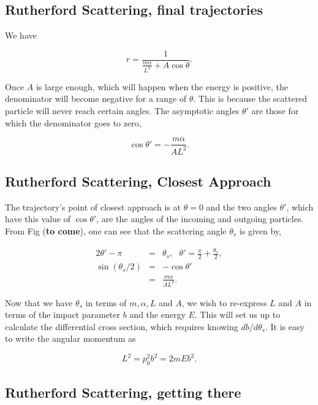 \documentclass[%
oneside,                 %
final,                   %
10pt]{article}
\begin{document}
\subsection{Rutherford Scattering, final trajectories}

We have

\begin{equation}\label{eq:ruthtraj}
r=\frac{1}{\frac{m\alpha}{L^2}+A\cos\theta}.
\end{equation}

Once $A$ is large enough, which will happen when the energy is
positive, the denominator will become negative for a range of
$\theta$. This is because the scattered particle will never reach
certain angles. The asymptotic angles $\theta'$ are those for which
the denominator goes to zero,

\begin{equation}
\cos\theta'=-\frac{m\alpha}{AL^2}.
\end{equation}

\subsection{Rutherford Scattering, Closest Approach}

The trajectory's point of closest approach is at $\theta=0$ and the
two angles $\theta'$, which have this value of $\cos\theta'$, are the
angles of the incoming and outgoing particles. From
Fig (\textbf{to come}), one can see that the scattering angle
$\theta_s$ is given by,

\begin{eqnarray}
\label{eq:sthetover2}
2\theta'-\pi&=&\theta_s,~~~\theta'=\frac{\pi}{2}+\frac{\theta_s}{2},\\
\nonumber
\sin(\theta_s/2)&=&-\cos\theta'\\
\nonumber
&=&\frac{m\alpha}{AL^2}.
\end{eqnarray}

Now that we have $\theta_s$ in terms of $m,\alpha,L$ and $A$, we wish
to re-express $L$ and $A$ in terms of the impact parameter $b$ and the
energy $E$. This will set us up to calculate the differential cross
section, which requires knowing $db/d\theta_s$. It is easy to write
the angular momentum as

\begin{equation}
L^2=p_0^2b^2=2mEb^2.
\end{equation}

\subsection{Rutherford Scattering, getting there}
\end{document}
